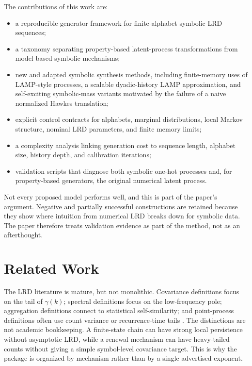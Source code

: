 \documentclass[journal]{IEEEtran}
\begin{document}
The contributions of this work are:
\begin{itemize}
\item a reproducible generator framework for finite-alphabet symbolic LRD
sequences;
\item a taxonomy separating property-based latent-process transformations from
model-based symbolic mechanisms;
\item new and adapted symbolic synthesis methods, including finite-memory uses
of LAMP-style processes, a scalable dyadic-history LAMP approximation, and
self-exciting symbolic-mass variants motivated by the failure of a naive
normalized Hawkes translation;
\item explicit control contracts for alphabets, marginal distributions, local
Markov structure, nominal LRD parameters, and finite memory limits;
\item a complexity analysis linking generation cost to sequence length, alphabet
size, history depth, and calibration iterations;
\item validation scripts that diagnose both symbolic one-hot processes and, for
property-based generators, the original numerical latent process.
\end{itemize}

Not every proposed model performs well, and this is part of the paper's
argument.  Negative and partially successful constructions are retained because
they show where intuition from numerical LRD breaks down for symbolic data.  The
paper therefore treats validation evidence as part of the method, not as an
afterthought.

\section{Related Work}

The LRD literature is mature, but not monolithic.  Covariance definitions focus
on the tail of \(\gamma(k)\); spectral definitions focus on the low-frequency
pole; aggregation definitions connect to statistical self-similarity; and
point-process definitions often use count variance or recurrence-time tails
\cite{beran1994_statistics,samorodnitsky2006_long,pipiras2017_long}.  The
distinctions are not academic bookkeeping.  A finite-state chain can have strong
local persistence without asymptotic LRD, while a renewal mechanism can have
heavy-tailed counts without giving a simple symbol-level covariance target.
This is why the package is organized by mechanism rather than by a single
advertised exponent.
\end{document}
